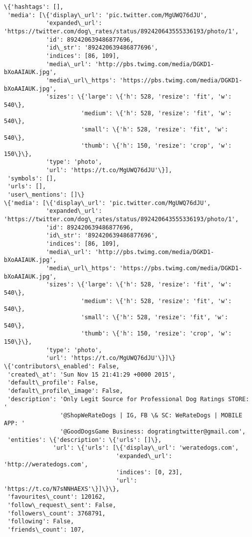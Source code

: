 \documentclass[11pt]{article}
\begin{document}
    \begin{Verbatim}[commandchars=\\\{\}]
\{'hashtags': [],
 'media': [\{'display\_url': 'pic.twitter.com/MgUWQ76dJU',
            'expanded\_url': 'https://twitter.com/dog\_rates/status/892420643555336193/photo/1',
            'id': 892420639486877696,
            'id\_str': '892420639486877696',
            'indices': [86, 109],
            'media\_url': 'http://pbs.twimg.com/media/DGKD1-bXoAAIAUK.jpg',
            'media\_url\_https': 'https://pbs.twimg.com/media/DGKD1-bXoAAIAUK.jpg',
            'sizes': \{'large': \{'h': 528, 'resize': 'fit', 'w': 540\},
                      'medium': \{'h': 528, 'resize': 'fit', 'w': 540\},
                      'small': \{'h': 528, 'resize': 'fit', 'w': 540\},
                      'thumb': \{'h': 150, 'resize': 'crop', 'w': 150\}\},
            'type': 'photo',
            'url': 'https://t.co/MgUWQ76dJU'\}],
 'symbols': [],
 'urls': [],
 'user\_mentions': []\}
\{'media': [\{'display\_url': 'pic.twitter.com/MgUWQ76dJU',
            'expanded\_url': 'https://twitter.com/dog\_rates/status/892420643555336193/photo/1',
            'id': 892420639486877696,
            'id\_str': '892420639486877696',
            'indices': [86, 109],
            'media\_url': 'http://pbs.twimg.com/media/DGKD1-bXoAAIAUK.jpg',
            'media\_url\_https': 'https://pbs.twimg.com/media/DGKD1-bXoAAIAUK.jpg',
            'sizes': \{'large': \{'h': 528, 'resize': 'fit', 'w': 540\},
                      'medium': \{'h': 528, 'resize': 'fit', 'w': 540\},
                      'small': \{'h': 528, 'resize': 'fit', 'w': 540\},
                      'thumb': \{'h': 150, 'resize': 'crop', 'w': 150\}\},
            'type': 'photo',
            'url': 'https://t.co/MgUWQ76dJU'\}]\}
\{'contributors\_enabled': False,
 'created\_at': 'Sun Nov 15 21:41:29 +0000 2015',
 'default\_profile': False,
 'default\_profile\_image': False,
 'description': 'Only Legit Source for Professional Dog Ratings STORE: '
                '@ShopWeRateDogs | IG, FB \& SC: WeRateDogs | MOBILE APP: '
                '@GoodDogsGame Business: dogratingtwitter@gmail.com',
 'entities': \{'description': \{'urls': []\},
              'url': \{'urls': [\{'display\_url': 'weratedogs.com',
                                'expanded\_url': 'http://weratedogs.com',
                                'indices': [0, 23],
                                'url': 'https://t.co/N7sNNHAEXS'\}]\}\},
 'favourites\_count': 120162,
 'follow\_request\_sent': False,
 'followers\_count': 3768791,
 'following': False,
 'friends\_count': 107,

\end{Verbatim}
\end{document}
